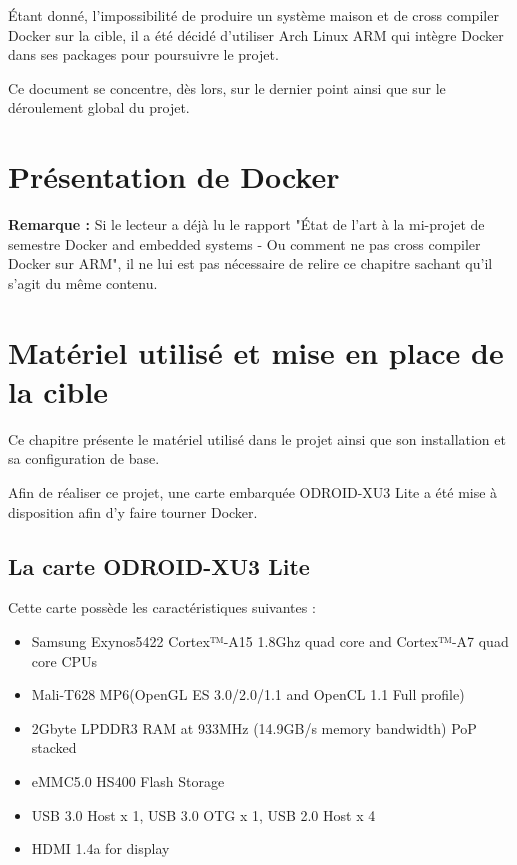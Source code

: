\documentclass[11pt,a4paper,oneside]{report}
\newcommand{\oldreportname}{État de l’art à la mi-projet de semestre Docker and embedded systems - Ou comment ne pas cross compiler Docker sur ARM}
\newcommand{\odroid}{ODROID-XU3 Lite }
\begin{document}
Étant donné, l'impossibilité de produire un système maison et de cross compiler Docker sur la cible, il a été décidé d'utiliser Arch Linux ARM qui intègre Docker dans ses packages pour poursuivre le projet.

Ce document se concentre, dès lors, sur le dernier point ainsi que sur le déroulement global du projet.


\chapter{Présentation de Docker}

\textbf{Remarque : } Si le lecteur a déjà lu le rapport "\oldreportname", il ne lui est pas nécessaire de relire ce chapitre sachant qu'il s'agit du même contenu.



\chapter{Matériel utilisé et mise en place de la cible}

Ce chapitre présente le matériel utilisé dans le projet ainsi que son installation et sa configuration de base.

Afin de réaliser ce projet, une carte embarquée \odroid a été mise à disposition afin d'y faire tourner Docker.

\section{La carte \odroid}

Cette carte possède les caractéristiques suivantes \cite{hardkernel_odroid_xu3}:

\begin{itemize}
\item Samsung Exynos5422 Cortex™-A15 1.8Ghz quad core and Cortex™-A7 quad core CPUs
\item Mali-T628 MP6(OpenGL ES 3.0/2.0/1.1 and OpenCL 1.1 Full profile)
\item 2Gbyte LPDDR3 RAM at 933MHz (14.9GB/s memory bandwidth) PoP stacked
\item eMMC5.0 HS400 Flash Storage
\item USB 3.0 Host x 1, USB 3.0 OTG x 1, USB 2.0 Host x 4
\item HDMI 1.4a for display
\end{itemize}
\end{document}
